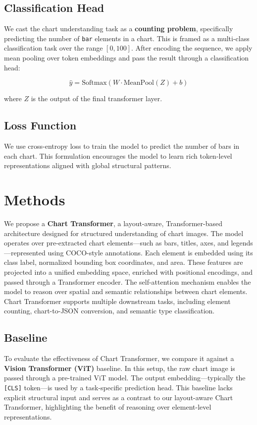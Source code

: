 \documentclass[11pt]{article}
\begin{document}
\subsection*{Classification Head}

We cast the chart understanding task as a \textbf{counting problem}, specifically predicting the number of \texttt{bar} elements in a chart. This is framed as a multi-class classification task over the range $[0, 100]$. After encoding the sequence, we apply mean pooling over token embeddings and pass the result through a classification head:

\[
\hat{y} = \text{Softmax}(W \cdot \text{MeanPool}(Z) + b)
\]

where $Z$ is the output of the final transformer layer.

\subsection*{Loss Function}

We use cross-entropy loss to train the model to predict the number of bars in each chart. This formulation encourages the model to learn rich token-level representations aligned with global structural patterns.


\section{Methods}

We propose a \textbf{Chart Transformer}, a layout-aware, Transformer-based architecture designed for structured understanding of chart images. The model operates over pre-extracted chart elements—such as bars, titles, axes, and legends—represented using COCO-style annotations. Each element is embedded using its class label, normalized bounding box coordinates, and area. These features are projected into a unified embedding space, enriched with positional encodings, and passed through a Transformer encoder. The self-attention mechanism enables the model to reason over spatial and semantic relationships between chart elements. Chart Transformer supports multiple downstream tasks, including element counting, chart-to-JSON conversion, and semantic type classification.

\subsection*{Baseline}

To evaluate the effectiveness of Chart Transformer, we compare it against a \textbf{Vision Transformer (ViT)} baseline. In this setup, the raw chart image is passed through a pre-trained ViT model. The output embedding—typically the \texttt{[CLS]} token—is used by a task-specific prediction head. This baseline lacks explicit structural input and serves as a contrast to our layout-aware Chart Transformer, highlighting the benefit of reasoning over element-level representations.
\end{document}
